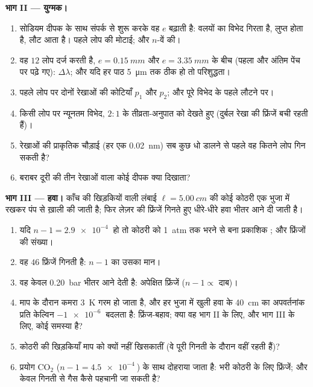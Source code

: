 \begin{problem}
\medskip
\noindent\textbf{भाग II --- युग्मक।}
\begin{enumerate}[resume]
  \item सोडियम दीपक के साथ संपर्क से शुरू करके वह $e$ बढ़ाती है:
        वलयों का विभेद गिरता है, लुप्त होता है, लौट आता है। पहले
        लोप की मोटाई; और $n$-वें की।
  \item वह $12$ लोप दर्ज करती है, $e = \qty{0.15}{mm}$ और $e = \qty{3.35}{mm}$
        के बीच (पहला और अंतिम पेंच पर पढ़े गए):
        $\Delta\lambda$; और यदि हर पाठ \qty{5}{\micro m} तक ठीक हो तो परिशुद्धता।
  \item पहले लोप पर दोनों रेखाओं की कोटियाँ $p_1$ और $p_2$;
        और पूरे विभेद के पहले लौटने पर।
  \item किसी लोप पर न्यूनतम विभेद, $2 : 1$ के तीव्रता-अनुपात
        को देखते हुए (दुर्बल रेखा की फ्रिंजें बची रहती हैं)।
  \item रेखाओं की प्राकृतिक चौड़ाई (हर एक \qty{0.02}{nm}) सब कुछ धो
        डालने से पहले वह कितने लोप गिन सकती है?
  \item बराबर दूरी की तीन रेखाओं वाला कोई दीपक क्या दिखाता?
\end{enumerate}

\medskip
\noindent\textbf{भाग III --- हवा।}
काँच की खिड़कियों वाली लंबाई $\ell = \qty{5.00}{cm}$ की कोई कोठरी एक भुजा में
रखकर पंप से ख़ाली की जाती है; फिर लेज़र की फ्रिंजें गिनते हुए धीरे-धीरे हवा
भीतर आने दी जाती है।
\begin{enumerate}[resume]
  \item यदि $n - 1 = \qty{2.9e-4}{}$ हो तो कोठरी को \qty{1}{atm} तक भरने से
        बना प्रकाशिक ; और फ्रिंजों की संख्या।
  \item वह $46$ फ्रिंजें गिनती है: $n - 1$ का उसका मान।
  \item वह केवल \qty{0.20}{bar} भीतर आने देती है: अपेक्षित फ्रिंजें ($n - 1 \propto$
        दाब)।
  \item माप के दौरान कमरा \qty{3}{K} गरम हो जाता है, और हर भुजा में
        खुली हवा के \qty{40}{cm} का अपवर्तनांक प्रति केल्विन
        $-\qty{1e-6}{}$ बदलता है: फ्रिंज-बहाव; क्या वह भाग II के लिए,
        और भाग III के लिए, कोई समस्या है?
  \item कोठरी की खिड़कियाँ माप को क्यों नहीं खिसकातीं (वे पूरी गिनती
        के दौरान वहीं रहती हैं)?
  \item प्रयोग CO$_2$ ($n - 1 = \qty{4.5e-4}{}$) के साथ दोहराया जाता है:
        भरी कोठरी के लिए फ्रिंजें; और केवल गिनती से गैस कैसे पहचानी जा
        सकती है?
\end{enumerate}


\end{problem}
